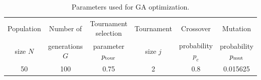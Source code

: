 \documentclass[12pt,titlepage]{article}
\begin{document}

\begin{table}[H]
\centering
\begin{tabular}{cccccc}
\toprule
Population & Number of & Tournament selection & Tournament  & Crossover  & Mutation \\
size $N$ & generations $G$ & parameter $p_{\textup{tour}}$ & size $j$ & probability	$p_c$ & probability $p_{\textup{mut}}$ \\
\midrule
50 & 100 & 0.75 & 2 & 0.8 & 0.015625\\
\bottomrule
\end{tabular}
\caption{Parameters used for GA optimization.}
\label{tabInitialParams}
\end{table}
\end{document}
